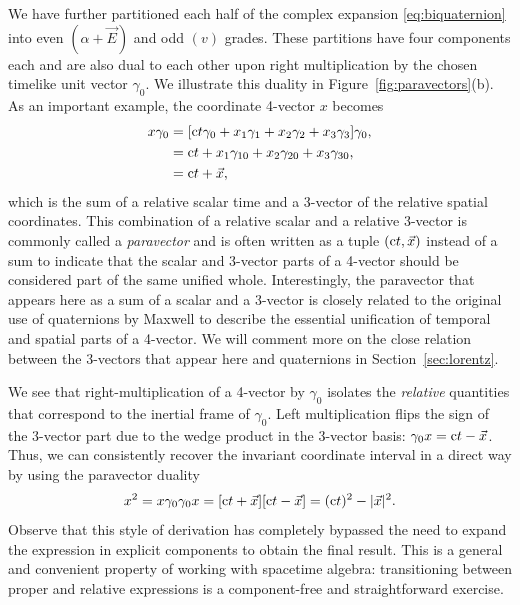 \documentclass[1p,sort&compress]{elsarticle}
\numberwithin{equation}{section}
\newcommand{\rv}[1]{\vec{#1}}
\newcommand{\cc}{{\rm c}}
\begin{document}
We have further partitioned each half of the complex expansion \eqref{eq:biquaternion} into even $(\alpha + \rv{E})$ and odd $(v)$ grades.  These partitions have four components each and are also dual to each other upon right multiplication by the chosen timelike unit vector $\gamma_0$.  We illustrate this duality in Figure~\ref{fig:paravectors}(b).  As an important example, the coordinate 4-vector $x$ becomes 
\begin{align}
  x\gamma_0 &= [\cc t \gamma_0 + x_1 \gamma_1 + x_2 \gamma_2 + x_3 \gamma_3]\gamma_0, \\
  &= \cc t + x_1 \gamma_{10} + x_2 \gamma_{20} + x_3 \gamma_{30}, \nonumber \\
  &= \cc t + \rv{x}, \nonumber
\end{align}
which is the sum of a relative scalar time and a 3-vector of the relative spatial coordinates.  This combination of a relative scalar and a relative 3-vector is commonly called a \emph{paravector} \cite{Hestenes1999,Baylis2002} and is often written as a tuple $(\cc t,\rv{x})$ instead of a sum to indicate that the scalar and 3-vector parts of a 4-vector should be considered part of the same unified whole.  Interestingly, the paravector that appears here as a sum of a scalar and a 3-vector is closely related to the original use of quaternions by Maxwell \cite{Maxwell1881} to describe the essential unification of temporal and spatial parts of a 4-vector.  We will comment more on the close relation between the 3-vectors that appear here and quaternions in Section~\ref{sec:lorentz}.

We see that right-multiplication of a 4-vector by $\gamma_0$ isolates the \emph{relative} quantities that correspond to the inertial frame of $\gamma_0$.  Left multiplication flips the sign of the 3-vector part due to the wedge product in the 3-vector basis: $\gamma_0 x = \cc t - \rv{x}$.  Thus, we can consistently recover the invariant coordinate interval in a direct way by using the paravector duality 
\begin{align}
  x^2 = x\gamma_0\gamma_0x = [\cc t + \rv{x}][\cc t - \rv{x}] = (\cc t)^2 - |\rv{x}|^2.
\end{align}
Observe that this style of derivation has completely bypassed the need to expand the expression in explicit components to obtain the final result.  This is a general and convenient property of working with spacetime algebra: transitioning between proper and relative expressions is a component-free and straightforward exercise.  
\end{document}
